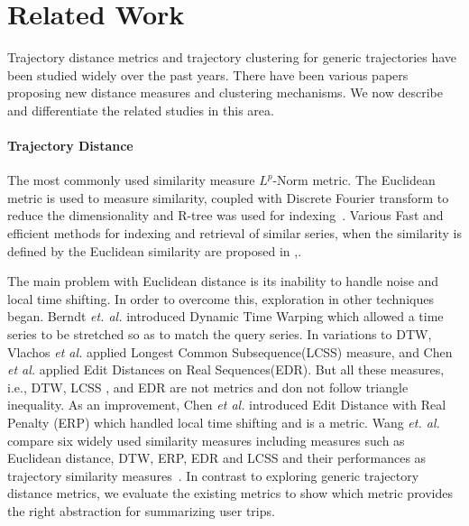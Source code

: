 \section{Related Work}
\label{sec:related}
Trajectory distance metrics and trajectory clustering for generic trajectories have been studied widely over the past years. There have been various papers proposing new distance measures and clustering mechanisms. We now describe and differentiate the related studies in this area.

\paragraph{Trajectory Distance}
The most commonly used similarity measure $L^p$-Norm metric. The Euclidean metric is used to measure similarity, coupled with Discrete Fourier transform to reduce the dimensionality and R-tree was used for indexing~\cite{lp1}. Various Fast and efficient methods for indexing and retrieval of similar series, when the similarity is defined by the Euclidean similarity are proposed in \cite{lp1},\cite{lp2}. 

The main problem with Euclidean distance is its inability to handle noise and local time shifting. In order to overcome this, exploration in other techniques began. Berndt \emph{et. al.} \cite{dtw} introduced Dynamic Time Warping which allowed  a time series to be stretched so as to match the query series. In variations to DTW, Vlachos \emph{et al.} \cite{Vlachos2002} applied Longest Common Subsequence(LCSS) measure, and Chen \emph{et al.}\cite{Chen2005} applied  Edit Distances on Real Sequences(EDR). But all these measures, i.e., DTW, LCSS , and EDR are not metrics and don not follow triangle inequality. As an improvement, Chen \emph{et al.}\cite{Chen2005} introduced Edit Distance with Real Penalty (ERP) which handled local time shifting and is a metric. Wang \emph{et. al.} compare six widely used similarity measures including measures such as Euclidean distance, DTW, ERP, EDR and LCSS and their performances as trajectory similarity measures~\cite{simcomp}. In contrast to exploring generic trajectory distance metrics, we evaluate the existing metrics to show which metric provides the right abstraction for summarizing user trips.


